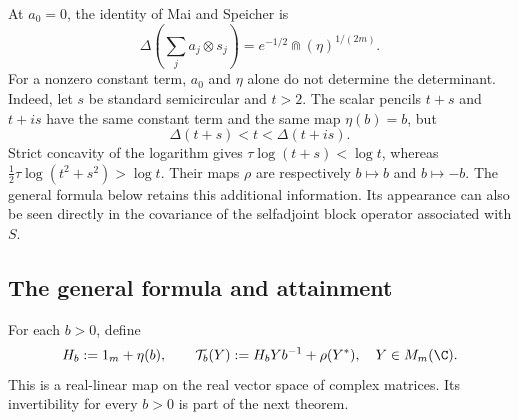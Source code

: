 At $a_0=0$, the identity of Mai and Speicher is
\begin{equation}\label{eq:centered-capacity}
 \Delta\left(\sum_j a_j\otimes s_j\right)
       =e^{-1/2}\Cap(\eta)^{1/(2m)}.
\end{equation}
For a nonzero constant term, $a_0$ and $\eta$ alone do not determine the determinant.
Indeed, let $s$ be standard semicircular and $t>2$.
The scalar pencils $t+s$ and $t+is$ have the same constant term and the same map $\eta(b)=b$, but
\begin{equation}\label{eq:phase-obstruction}
 \Delta(t+s)<t<\Delta(t+is).
\end{equation}
Strict concavity of the logarithm gives $\tau\log(t+s)<\log t$, whereas $\tfrac12\tau\log(t^2+s^2)>\log t$.
Their maps $\rho$ are respectively $b\mapsto b$ and $b\mapsto-b$.
The general formula below retains this additional information.
Its appearance can also be seen directly in the covariance of the selfadjoint block operator associated with $S$.

\subsection{The general formula and attainment}
For each $b>0$, define
\begin{equation}\label{eq:inner-map}
 H_b:=1_m+\eta(b),\qquad
 \mathcal T_b(Y):=H_bYb^{-1}+\rho(Y^*),\quad Y\in M_m(\C).
\end{equation}
This is a real-linear map on the real vector space of complex matrices.
Its invertibility for every $b>0$ is part of the next theorem.


